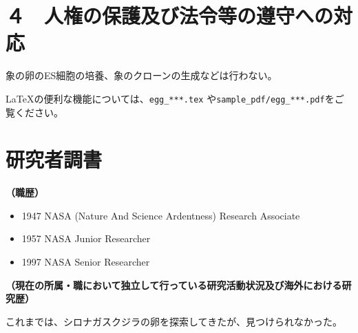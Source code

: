 \documentclass[11pt,a4j,dvipdfmx]{jarticle} 					%
\newcommand{\研究課題名}{象の卵}
\newcommand{\研究機関名}{逢坂大学}
\newcommand{\研究代表者氏名}{湯川秀樹}
\newcommand{\研究期間の最終元号年度}{5}  %
\begin{document}



\section{４　人権の保護及び法令等の遵守への対応}

	象の卵のES細胞の培養、象のクローンの生成などは行わない。

	\LaTeX の便利な機能については、\texttt{egg\_***.tex} や\texttt{sample\_pdf/egg\_***.pdf}をご覧ください。




\section{研究者調書}


\newcommand{\研究者氏名ふりがな}{ゆかわ　ひでき}
\newcommand{\研究者生年月日の年}{1900}
\newcommand{\研究者生年月日の月}{2}
\newcommand{\研究者生年月日の日}{29}
\newcommand{\研究者年齢}{139}
\newcommand{\研究者所属機関部局職}{\small{NASA, Senior Researcher}}	%
\newcommand{\研究者学位}{理学博士}
\newcommand{\研究者現在の専門}{原始殻実験}
\newcommand{\外国機関の所属年数}{70年}

\noindent
\textbf{（職歴）}\\
	\begin{itemize}
		\item 1947 NASA (Nature And Science Ardentness) Research Associate
		\item 1957 NASA Junior Researcher
		\item 1997 NASA Senior Researcher
	\end{itemize}

\noindent
\textbf{（現在の所属・職において独立して行っている研究活動状況及び海外における研究歴）}\\
\kikokuInstructions

	これまでは、シロナガスクジラの卵を探索してきたが、見つけられなかった。



\end{document}
